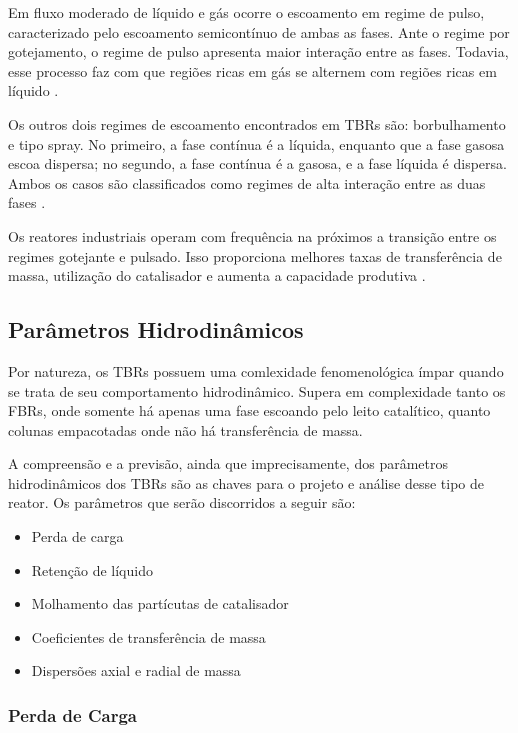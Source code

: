 Em fluxo moderado de líquido e gás ocorre o escoamento em regime de pulso,
caracterizado pelo escoamento semicontínuo de ambas as fases. Ante o regime
por gotejamento, o regime de pulso apresenta maior interação entre as fases.
Todavia, esse processo faz com que regiões ricas em gás se alternem com regiões
ricas em líquido \cite{Saroha1996}.

Os outros dois regimes de escoamento encontrados em TBRs são: borbulhamento e
tipo spray. No primeiro, a fase contínua é a líquida, enquanto que a fase gasosa
escoa dispersa; no segundo, a fase contínua é a gasosa, e a fase líquida é
dispersa. Ambos os casos são classificados como regimes de alta interação entre
as duas fases \cite{Saroha1996}.

Os reatores industriais operam com frequência na próximos a transição entre os
regimes gotejante e pulsado. Isso proporciona melhores taxas de transferência de
massa, utilização do catalisador e aumenta a capacidade produtiva
\cite{Ancheyta2011}.

\subsection{Parâmetros Hidrodinâmicos}
\label{sec:parametroshidrodinamicos}

Por natureza, os TBRs possuem uma comlexidade fenomenológica ímpar quando se
trata de seu comportamento hidrodinâmico. Supera em complexidade tanto os FBRs,
onde somente há apenas uma fase escoando pelo leito catalítico, quanto colunas
empacotadas onde não há transferência de massa. 

A compreensão e a previsão, ainda que imprecisamente, dos parâmetros
hidrodinâmicos dos TBRs são as chaves para o projeto e análise desse tipo de
reator. Os parâmetros que serão discorridos a seguir são:

\begin{itemize}
  \item Perda de carga
  \item Retenção de líquido
  \item Molhamento das partícutas de catalisador
  \item Coeficientes de transferência de massa
  \item Dispersões axial e radial de massa
\end{itemize}

\subsubsection{Perda de Carga}
\label{sec:perdadecarga}

